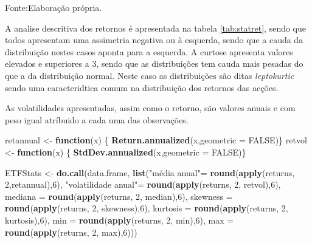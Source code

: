 \documentclass[
  12pt,
  a4paper,
  openany]{book}
\newenvironment{Shaded}{\begin{snugshade}}{\end{snugshade}}
\newcommand{\ControlFlowTok}[1]{\textcolor[rgb]{0.13,0.29,0.53}{\textbf{#1}}}
\newcommand{\DataTypeTok}[1]{\textcolor[rgb]{0.13,0.29,0.53}{#1}}
\newcommand{\DecValTok}[1]{\textcolor[rgb]{0.00,0.00,0.81}{#1}}
\newcommand{\KeywordTok}[1]{\textcolor[rgb]{0.13,0.29,0.53}{\textbf{#1}}}
\newcommand{\NormalTok}[1]{#1}
\newcommand{\OtherTok}[1]{\textcolor[rgb]{0.56,0.35,0.01}{#1}}
\newcommand{\StringTok}[1]{\textcolor[rgb]{0.31,0.60,0.02}{#1}}
\begin{document}
Fonte:Elaboração própria.

\justifying
\bigskip

A analise descritiva dos retornos é apresentada na tabela \ref{tab:statret}, sendo que todos apresentam uma assimetria negativa ou à esquerda, sendo que a cauda da distribuição nestes casos aponta para a esquerda. A curtose apresenta valores elevados e superiores a 3, sendo que as distribuições tem cauda mais pesadas do que a da distribuição normal. Neste caso as distribuições são ditas \emph{leptokurtic} sendo uma caracteridtica comum na distribuição dos retornos das acções.

As volatilidades apresentadas, assim como o retorno, são valores anuais e com peso igual atríbuido a cada uma das observações.

\scriptsize

\begin{Shaded}
\begin{Highlighting}[]
\NormalTok{retannual \textless{}{-}}\StringTok{ }\ControlFlowTok{function}\NormalTok{(x) \{  }
  \KeywordTok{Return.annualized}\NormalTok{(x,}\DataTypeTok{geometric =} \OtherTok{FALSE}\NormalTok{)\}}
\NormalTok{retvol \textless{}{-}}\StringTok{ }\ControlFlowTok{function}\NormalTok{(x) \{  }
  \KeywordTok{StdDev.annualized}\NormalTok{(x,}\DataTypeTok{geometric =} \OtherTok{FALSE}\NormalTok{)\}}

\NormalTok{ETFStats \textless{}{-}}\StringTok{ }\KeywordTok{do.call}\NormalTok{(data.frame, }
                    \KeywordTok{list}\NormalTok{(}\StringTok{"média anual"}\NormalTok{=}\StringTok{ }\KeywordTok{round}\NormalTok{(}\KeywordTok{apply}\NormalTok{(returns, }\DecValTok{2}\NormalTok{,retannual),}\DecValTok{6}\NormalTok{),}
                         \StringTok{"volatilidade anual"}\NormalTok{=}\StringTok{ }\KeywordTok{round}\NormalTok{(}\KeywordTok{apply}\NormalTok{(returns, }\DecValTok{2}\NormalTok{, retvol),}\DecValTok{6}\NormalTok{),}
                         \DataTypeTok{mediana =} \KeywordTok{round}\NormalTok{(}\KeywordTok{apply}\NormalTok{(returns, }\DecValTok{2}\NormalTok{, median),}\DecValTok{6}\NormalTok{),}
                         \DataTypeTok{skewness =} \KeywordTok{round}\NormalTok{(}\KeywordTok{apply}\NormalTok{(returns, }\DecValTok{2}\NormalTok{, skewness),}\DecValTok{6}\NormalTok{),}
                         \DataTypeTok{kurtosis =} \KeywordTok{round}\NormalTok{(}\KeywordTok{apply}\NormalTok{(returns, }\DecValTok{2}\NormalTok{, kurtosis),}\DecValTok{6}\NormalTok{),}
                         \DataTypeTok{min =} \KeywordTok{round}\NormalTok{(}\KeywordTok{apply}\NormalTok{(returns, }\DecValTok{2}\NormalTok{, min),}\DecValTok{6}\NormalTok{),}
                         \DataTypeTok{max =} \KeywordTok{round}\NormalTok{(}\KeywordTok{apply}\NormalTok{(returns, }\DecValTok{2}\NormalTok{, max),}\DecValTok{6}\NormalTok{)))}
\end{Highlighting}
\end{Shaded}
\end{document}

